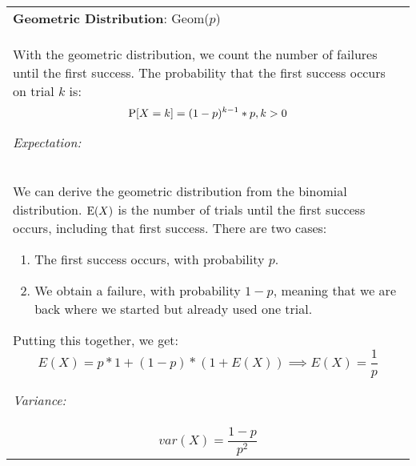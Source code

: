 {\tabulinesep=1mm
\begin{tabu}{|p{16cm} |}
\hline
\textbf{Geometric Distribution}: Geom($p$) \\

With the geometric distribution, we count the number of failures until the first success. The probability that the first success occurs on trial $k$ is:
\[ \P[X = k] = (1 - p)^{k - 1}*p, k > 0\]

\textit{Expectation:} \\
We can derive the geometric distribution from the binomial distribution. $\E(X)$ is the number of trials until the first success occurs, including that first success. There are two cases:
\begin{enumerate}
	\item{The first success occurs, with probability $p$.}
	\item{We obtain a failure, with probability $1-p$, meaning that we are back where we started but already used one trial.}
\end{enumerate}
Putting this together, we get:
$$E(X) = p * 1 + (1-p) * (1 + E(X)) \implies E(X) = \frac{1}{p}$$

\textit{Variance:} \\
$$var(X) = \frac{1-p}{p^2}$$
\\
\hline
\end{tabu}
}